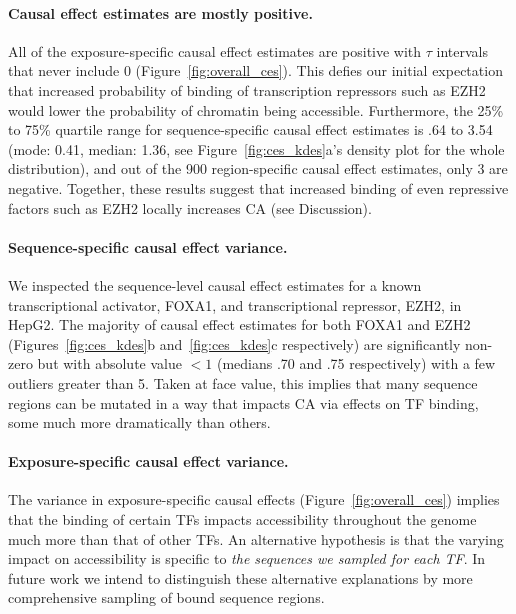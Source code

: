 \documentclass{article}
\begin{document}
\paragraph*{Causal effect estimates are mostly positive.}
All of the exposure-specific causal effect estimates are positive with \( \tau \) intervals that never include 0 (Figure~\ref{fig:overall_ces}). This defies our initial expectation that increased probability of binding of transcription repressors such as EZH2 would lower the probability of chromatin being accessible. Furthermore, the 25\% to 75\% quartile range for sequence-specific causal effect estimates is .64 to 3.54 (mode: 0.41, median: 1.36, see Figure~\ref{fig:ces_kdes}a's density plot for the whole distribution), and out of the 900 region-specific causal effect estimates, only 3 are negative. Together, these results suggest that increased binding of even repressive factors such as EZH2 locally increases CA (see Discussion).

\paragraph*{Sequence-specific causal effect variance.}
We inspected the sequence-level causal effect estimates for a known transcriptional activator, FOXA1, and transcriptional repressor, EZH2, in HepG2. The majority of causal effect estimates for both FOXA1 and EZH2 (Figures~\ref{fig:ces_kdes}b and~\ref{fig:ces_kdes}c respectively) are significantly non-zero but with absolute value \(<1\) (medians .70 and .75 respectively) with a few outliers greater than 5. Taken at face value, this implies that many sequence regions can be mutated in a way that impacts CA via effects on TF binding, some much more dramatically than others.

\paragraph*{Exposure-specific causal effect variance.}
The variance in exposure-specific causal effects (Figure~\ref{fig:overall_ces}) implies that the binding of certain TFs impacts accessibility throughout the genome much more than that of other TFs. An alternative hypothesis is that the varying impact on accessibility is specific to \emph{the sequences we sampled for each TF}. In future work we intend to distinguish these alternative explanations by more comprehensive sampling of bound sequence regions.
\end{document}
